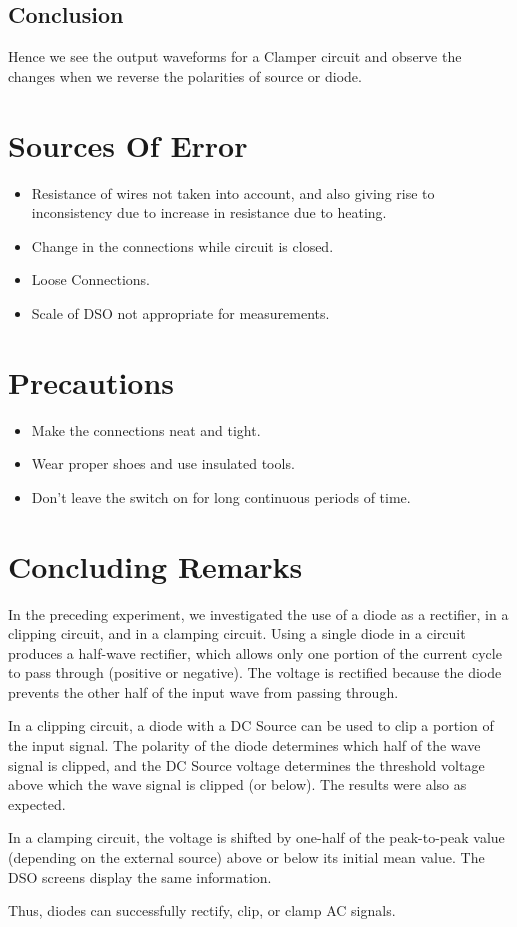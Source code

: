 \documentclass{article}
\begin{document}
\subsection{Conclusion}
Hence we see the output waveforms for a Clamper circuit and observe the changes when we reverse the polarities of source or diode.
\newpage
\section{Sources Of Error}
\begin{itemize}
    \item Resistance of wires not taken into account, and also giving rise to inconsistency due to increase in resistance due to heating.
    \item Change in the connections while circuit is closed.
    \item Loose Connections.
    \item Scale of DSO not appropriate for measurements.
\end{itemize}
\section{Precautions}
\begin{itemize}
    \item Make the connections neat and tight.
    \item Wear proper shoes and use insulated tools.
    \item Don’t leave the switch on for long continuous periods of time.
\end{itemize}
\section{Concluding Remarks}
In the preceding experiment, we investigated the use of a diode as a rectifier, in a clipping circuit, and in a clamping circuit. Using a single diode in a circuit produces a half-wave rectifier, which allows only one portion of the current cycle to pass through (positive or negative). The voltage is rectified because the diode prevents the other half of the input wave from passing through.

In a clipping circuit, a diode with a DC Source can be used to clip a portion of the input signal. The polarity of the diode determines which half of the wave signal is clipped, and the DC Source voltage determines the threshold voltage above which the wave signal is clipped (or below). The results were also as expected.

In a clamping circuit, the voltage is shifted by one-half of the peak-to-peak value (depending on the external source) above or below its initial mean value. The DSO screens display the same information.\par
Thus, diodes can successfully rectify, clip, or clamp AC signals.
\end{document}
